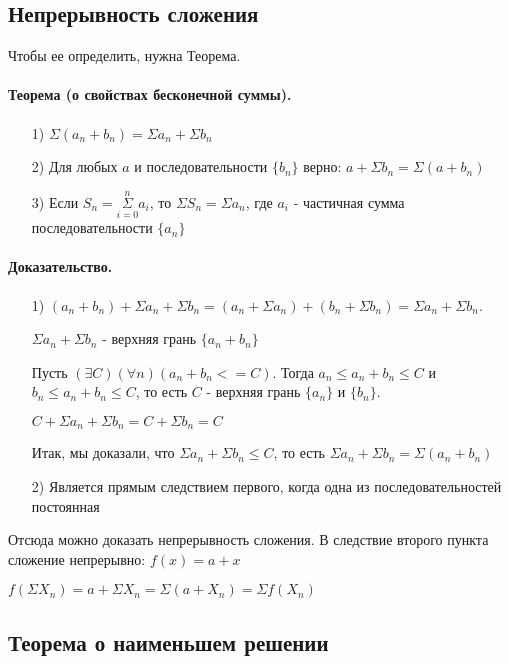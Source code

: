 \documentclass{report}
\begin{document}
\subsection{Непрерывность сложения}
Чтобы ее определить, нужна Теорема.

\paragraph*{Теорема (о свойствах бесконечной суммы).}
\begin{itemize}
	\item[1)] $\Sigma(a_n + b_n) = \Sigma a_n + \Sigma b_n$
	\item[2)] Для любых $a$ и последовательности $\{b_n\}$ верно:\newline
		$a + \Sigma b_n = \Sigma(a + b_n)$
	\item[3)] Если $S_n = \underset{i=0}{\overset{n}{\Sigma}} a_i$, то $\Sigma S_n = \Sigma a_n$, где
		$a_i$ - частичная сумма последовательности $\{a_n\}$
\end{itemize}
\paragraph*{Доказательство.}
\begin{itemize}
	\item[1)] $(a_n + b_n) + \Sigma a_n + \Sigma b_n = (a_n + \Sigma a_n) + (b_n + \Sigma b_n) =
			\Sigma a_n + \Sigma b_n$.

		$\Sigma a_n + \Sigma b_n$ - верхняя грань $\{a_n + b_n\}$

		Пусть $(\exists C)(\forall n)(a_n + b_n <= C)$. Тогда $a_n \leq a_n + b_n \leq C$ и
		$b_n \leq a_n + b_n \leq C$, то есть $C$ - верхняя грань $\{a_n\}$ и $\{b_n\}$.

		$C + \Sigma a_n + \Sigma b_n = C + \Sigma b_n = C$

		Итак, мы доказали, что $\Sigma a_n + \Sigma b_n \leq C$, то есть
		$\Sigma a_n + \Sigma b_n = \Sigma (a_n + b_n)$
	\item[2)] Является прямым следствием первого, когда одна из последовательностей постоянная
\end{itemize}

\medskip

Отсюда можно доказать непрерывность сложения. В следствие второго пункта сложение непрерывно: $f(x) = a + x$

$f(\Sigma X_n) = a + \Sigma X_n = \Sigma(a + X_n) = \Sigma f(X_n)$

\subsection{Теорема о наименьшем решении}
\end{document}
